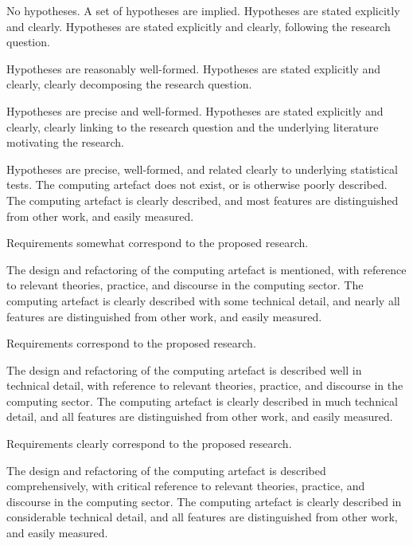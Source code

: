 \begin{markingrubric}
%    
            \grade\fail   No hypotheses.
        \grade 		A set of hypotheses are implied.
        \grade 		Hypotheses are stated explicitly and clearly.
        \grade 		Hypotheses are stated explicitly and clearly, following the research question.
        \par		Hypotheses are reasonably well-formed.
        \grade 		Hypotheses are stated explicitly and clearly, clearly decomposing the research question.
        \par		Hypotheses are precise and well-formed.
        \grade 		Hypotheses are stated explicitly and clearly, clearly linking to the research question and the underlying literature motivating the research.
        \par		Hypotheses are precise, well-formed, and related clearly to underlying statistical tests.
%
        \grade \fail The computing artefact does not exist, or is otherwise poorly described.
        \grade The computing artefact is clearly described, and most features are distinguished from other work, and easily measured.
            \par Requirements somewhat correspond to the proposed research.
            \par The design and refactoring of the computing artefact is mentioned, with reference to relevant theories, practice, and discourse in the computing sector.
        \grade The computing artefact is clearly described with some technical detail, and nearly all features are distinguished from other work, and easily measured.
            \par Requirements correspond to the proposed research.
            \par The design and refactoring of the computing artefact is described well in technical detail, with reference to relevant theories, practice, and discourse in the computing sector.
        \grade The computing artefact is clearly described in much technical detail, and all features are distinguished from other work, and easily measured.
            \par Requirements clearly correspond to the proposed research.
            \par The design and refactoring of the computing artefact is described comprehensively, with critical reference to relevant theories, practice, and discourse in the computing sector.
        \grade The computing artefact is clearly described in considerable technical detail, and all features are distinguished from other work, and easily measured.

\end{markingrubric}
